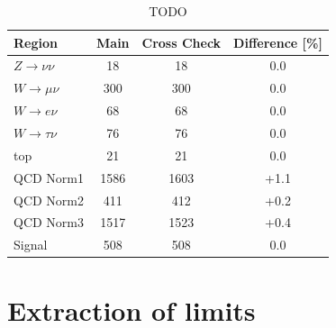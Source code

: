 \begin{table}[!htb]
\centering
\begin{tabular}{|l|c|c|c|}
\hline
Region                & Main & Cross Check & Difference [\%] \\
\hline\hline
$Z\rightarrow\nu\nu$  &   18 &          18 &             0.0 \\
$W\rightarrow\mu\nu$  &  300 &         300 &             0.0 \\
$W\rightarrow e\nu$   &   68 &          68 &             0.0 \\
$W\rightarrow\tau\nu$ &   76 &          76 &             0.0 \\
top                   &   21 &          21 &             0.0 \\
QCD Norm1             & 1586 &        1603 &            +1.1 \\
QCD Norm2             &  411 &         412 &            +0.2 \\
QCD Norm3             & 1517 &        1523 &            +0.4 \\
\hline\hline
Signal                &  508 &         508 &             0.0 \\
\hline
\end{tabular}
\caption{TODO}
\label{TABLE:ParkedDataAnalysis_Results_MainCrossCheckComparison}
\end{table}



\section{Extraction of limits}



